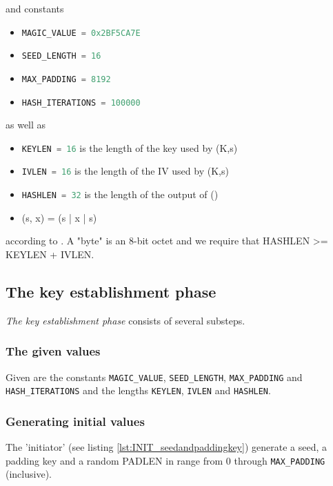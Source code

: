 \documentclass[sigconf, screen]{acmart}
\begin{document}
and constants
\begin{itemize}
    \item \lstinline[language=C]{MAGIC_VALUE = 0x2BF5CA7E}
    \item \lstinline[language=C]{SEED_LENGTH = 16}
    \item \lstinline[language=C]{MAX_PADDING = 8192}
    \item \lstinline[language=C]{HASH_ITERATIONS = 100000}
\end{itemize}

as well as
\begin{itemize}
    \item \lstinline[language=C]{KEYLEN = 16} is the length of the key used by \enc(K,s)
    \item \lstinline[language=C]{IVLEN = 16} is the length of the IV used by \enc(K,s)
    \item \lstinline[language=C]{HASHLEN = 32} is the length of the output of \hash()
    \item \mac(s, x) = \hash(s | x | s)
\end{itemize}

according to \cite{TorGitWebObfs2Specification}. A "byte" is an 8-bit octet and we require that HASHLEN >= KEYLEN + IVLEN.
\subsection{The key establishment phase}
\label{ss:theKeyestablishmentphase}
\textit{The key establishment phase} consists of several substeps.
\subsubsection{The given values}
\label{sss:thegivenvalues}
Given are the constants \lstinline[language=C]{MAGIC_VALUE}, \lstinline[language=C]{SEED_LENGTH}, \lstinline[language=C]{MAX_PADDING} and \lstinline[language=C]{HASH_ITERATIONS} and the lengths \lstinline[language=C]{KEYLEN}, \lstinline[language=C]{IVLEN} and \lstinline[language=C]{HASHLEN}.
\subsubsection{Generating initial values}
\label{sss:generatinginitialvalues}
The 'initiator' (see listing \ref{lst:INIT_seedandpaddingkey}) generate a seed, a padding key and a random PADLEN in range from 0 through \lstinline[language=C]{MAX_PADDING} (inclusive).
\end{document}
